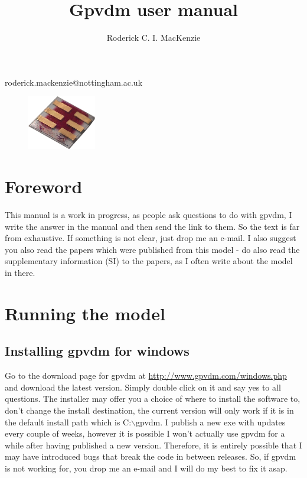 \documentclass[11pt]{article}
\begin{document}
\title{Gpvdm user manual}

\author{Roderick C. I. MacKenzie}


\maketitle




\centerline{roderick.mackenzie@nottingham.ac.uk}


\begin{figure}[ht!]
\centering
\includegraphics[width=30mm]{./images/cell.jpg}
\label{overflow}
\end{figure}

\newpage
\section{Foreword}
This manual is a work in progress, as people ask questions to do with gpvdm, I write the answer in the manual and then send the link to them.  So the text is far from exhaustive.  If something is not clear, just drop me an e-mail.  I also suggest you also read the papers which were published from this model - do also read the supplementary information (SI) to the papers, as I often write about the model in there.

\section{Running the model}

\subsection{Installing gpvdm for windows}
Go to the download page for gpvdm at \url{http://www.gpvdm.com/windows.php} and download the latest version.  Simply double click on it and say yes to all questions.  The installer may offer you a choice of where to install the software to, don't change the install destination, the current version will only work if it is in the default install path which is C:$\backslash$gpvdm.  I publish a new exe with updates every couple of weeks, however it is possible I won't actually use gpvdm for a while after having published a new version.  Therefore, it is entirely possible that I may have introduced bugs that break the code in between releases.  So, if gpvdm is not working for, you drop me an e-mail and I will do my best to fix it asap.
\end{document}
